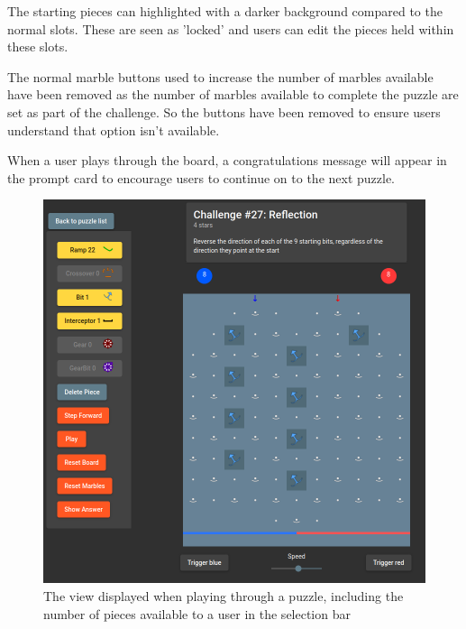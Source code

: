 \documentclass{l4proj}
\begin{document}
The starting pieces can highlighted with a darker background compared to the normal slots. These are seen as 'locked' and users can edit the pieces held within these slots. 

The normal marble buttons used to increase the number of marbles available have been removed as the number of marbles available to complete the puzzle are set as part of the challenge. So the buttons have been removed to ensure users understand that option isn't available. 

When a user plays through the board, a congratulations message will appear in the prompt card to encourage users to continue on to the next puzzle.

\begin{figure}
    \centering
    \includegraphics[width=0.7\linewidth]{images/puzzle.png}
    \caption{The view displayed when playing through a puzzle, including the number of pieces available to a user in the selection bar}
    \label{fig:puzzle}
\end{figure}
\end{document}
